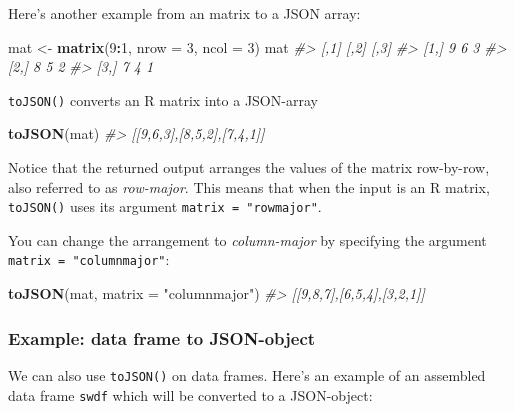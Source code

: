 \documentclass[
]{book}
\newenvironment{Shaded}{\begin{snugshade}}{\end{snugshade}}
\newcommand{\AttributeTok}[1]{\textcolor[rgb]{0.13,0.29,0.53}{#1}}
\newcommand{\CommentTok}[1]{\textcolor[rgb]{0.56,0.35,0.01}{\textit{#1}}}
\newcommand{\DecValTok}[1]{\textcolor[rgb]{0.00,0.00,0.81}{#1}}
\newcommand{\FunctionTok}[1]{\textcolor[rgb]{0.13,0.29,0.53}{\textbf{#1}}}
\newcommand{\NormalTok}[1]{#1}
\newcommand{\OtherTok}[1]{\textcolor[rgb]{0.56,0.35,0.01}{#1}}
\newcommand{\SpecialCharTok}[1]{\textcolor[rgb]{0.81,0.36,0.00}{\textbf{#1}}}
\newcommand{\StringTok}[1]{\textcolor[rgb]{0.31,0.60,0.02}{#1}}
\begin{document}
Here's another example from an matrix to a JSON array:

\begin{Shaded}
\begin{Highlighting}[]
\NormalTok{mat }\OtherTok{\textless{}{-}} \FunctionTok{matrix}\NormalTok{(}\DecValTok{9}\SpecialCharTok{:}\DecValTok{1}\NormalTok{, }\AttributeTok{nrow =} \DecValTok{3}\NormalTok{, }\AttributeTok{ncol =} \DecValTok{3}\NormalTok{)}
\NormalTok{mat}
\CommentTok{\#\textgreater{}      [,1] [,2] [,3]}
\CommentTok{\#\textgreater{} [1,]    9    6    3}
\CommentTok{\#\textgreater{} [2,]    8    5    2}
\CommentTok{\#\textgreater{} [3,]    7    4    1}
\end{Highlighting}
\end{Shaded}

\texttt{toJSON()} converts an R matrix into a JSON-array

\begin{Shaded}
\begin{Highlighting}[]
\FunctionTok{toJSON}\NormalTok{(mat)}
\CommentTok{\#\textgreater{} [[9,6,3],[8,5,2],[7,4,1]]}
\end{Highlighting}
\end{Shaded}

Notice that the returned output arranges the values of the matrix row-by-row,
also referred to as \emph{row-major}. This means that when the input is an R matrix,
\texttt{toJSON()} uses its argument \texttt{matrix\ =\ "rowmajor"}.

You can change the arrangement to \emph{column-major} by specifying the argument
\texttt{matrix\ =\ "columnmajor"}:

\begin{Shaded}
\begin{Highlighting}[]
\FunctionTok{toJSON}\NormalTok{(mat, }\AttributeTok{matrix =} \StringTok{"columnmajor"}\NormalTok{)}
\CommentTok{\#\textgreater{} [[9,8,7],[6,5,4],[3,2,1]]}
\end{Highlighting}
\end{Shaded}

\hypertarget{example-data-frame-to-json-object}{%
\subsubsection*{Example: data frame to JSON-object}\label{example-data-frame-to-json-object}}

We can also use \texttt{toJSON()} on data frames. Here's an example of an assembled
data frame \texttt{swdf} which will be converted to a JSON-object:
\end{document}
